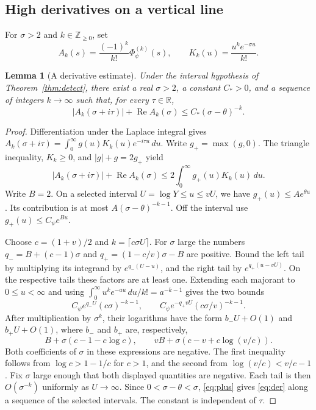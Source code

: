 \documentclass[a4paper,11pt]{article}
\newtheorem{lemma}[proposition]{Lemma}
\theoremstyle{definition}
\theoremstyle{remark}
\newcommand{\RR}{\mathbb R}\newcommand{\CC}{\mathbb C}\newcommand{\QQ}{\mathbb Q}
\newcommand{\ZZ}{\mathbb Z}\newcommand{\ord}{\operatorname{ord}}
\newcommand{\real}{\operatorname{Re}}\newcommand{\imag}{\operatorname{Im}}
\numberwithin{equation}{section}
\begin{document}
\subsection{High derivatives on a vertical line}\label{nav:I-05}
\label{sec:landau}
For \(\sigma>2\) and \(k\in\ZZ_{\ge0}\), set
\[
 A_k(s)=\frac{(-1)^k}{k!}\Phi_\psi^{(k)}(s),\qquad
 K_k(u)=\frac{u^k e^{-\sigma u}}{k!}.
\]
\begin{lemma}[A derivative estimate]\label{lem:kernel}
Under the interval hypothesis of Theorem~\ref{thm:detect}, there exist a real \(\sigma>2\), a constant \(C_*>0\), and a sequence of integers \(k\to\infty\) such that, for every \(\tau\in\RR\),
\begin{equation}
 |A_k(\sigma+i\tau)|+\real A_k(\sigma)\le C_*(\sigma-\theta)^{-k}.
 \label{eq:der}
\end{equation}
\end{lemma}
\begin{proof}
Differentiation under the Laplace integral gives \(A_k(\sigma+i\tau)=\int_0^\infty g(u)K_k(u)e^{-i\tau u}\,du\). Write \(g_+=\max(g,0)\). The triangle inequality, \(K_k\ge0\), and \(|g|+g=2g_+\) yield
\begin{equation}
 |A_k(\sigma+i\tau)|+\real A_k(\sigma)
               \le 2\int_0^\infty g_+(u)K_k(u)\,du. \label{eq:plus}
\end{equation}
Write \(B=2\). On a selected interval \(U=\log Y\le u\le vU\), we have \(g_+(u)\le A e^{\theta u}\). Its contribution is at most \(A(\sigma-\theta)^{-k-1}\). Off the interval use \(g_+(u)\le C_\psi e^{Bu}\).

Choose \(c=(1+v)/2\) and \(k=\lceil c\sigma U\rceil\). For \(\sigma\) large the numbers \(q_-=B+(c-1)\sigma\) and \(q_+=(1-c/v)\sigma-B\) are positive. Bound the left tail by multiplying its integrand by \(e^{q_-(U-u)}\), and the right tail by \(e^{q_+(u-vU)}\). On the respective tails these factors are at least one. Extending each majorant to \(0\le u<\infty\) and using \(\int_0^\infty u^k e^{-au}\,du/k!=a^{-k-1}\) gives the two bounds
\[
 C_\psi e^{q_-U}(c\sigma)^{-k-1},\qquad
 C_\psi e^{-q_+vU}(c\sigma/v)^{-k-1}.
\]
After multiplication by \(\sigma^k\), their logarithms have the form \(b_-U+O(1)\) and \(b_+U+O(1)\), where \(b_-\) and \(b_+\) are, respectively,
\[
 B+\sigma(c-1-c\log c),\qquad vB+\sigma(c-v+c\log(v/c)).
\]
Both coefficients of \(\sigma\) in these expressions are negative. The first inequality follows from \(\log c>1-1/c\) for \(c>1\), and the second from \(\log(v/c)<v/c-1\). Fix \(\sigma\) large enough that both displayed quantities are negative. Each tail is then \(O(\sigma^{-k})\) uniformly as \(U\to\infty\). Since \(0<\sigma-\theta<\sigma\), \eqref{eq:plus} gives \eqref{eq:der} along a sequence of the selected intervals. The constant is independent of \(\tau\).
\end{proof}
\end{document}
